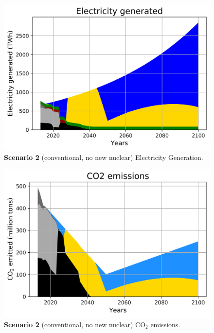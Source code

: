 \documentclass[final]{beamer}
\newlength{\onecolwid}
\newlength{\twocolwid}
\newlength{\threecolwid}
\begin{document}
\begin{frame}[t]
\begin{columns}[t,totalwidth=\threecolwid]
\begin{column}{\twocolwid}
\begin{columns}[t,totalwidth=\twocolwid]
\begin{column}{\onecolwid}
\begin{figure}[H] 
\centering
\includegraphics[scale=1.2]{conv_nonuc_elc}
\caption{\textbf{Scenario 2} (conventional, no new nuclear) Electricity Generation.}
\label{s2e}
\end{figure}

\begin{figure}[H] 
\centering
\includegraphics[scale=1.2]{conv_nonuc_co2}
\caption{\textbf{Scenario 2} (conventional, no new nuclear) CO$_2$ emissions.}
\label{s2c}
\end{figure}


\end{column} %


\end{columns}
\end{column}
\end{columns}
\end{frame}
\end{document}
